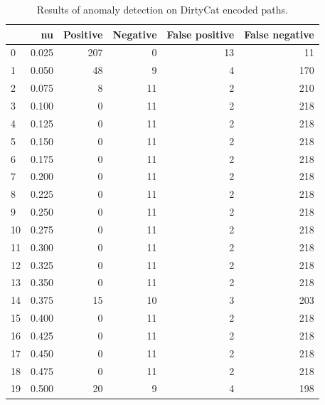 \documentclass[a4paper,twoside,12pt]{book}
\begin{document}
\begin{appendices}
\begin{table}
	\centering
	\caption{Results of anomaly detection on DirtyCat encoded paths.}
	\label{id:tab:ocsvmOnDirtyCatBad}
	\begin{tabular}{lrrrrr}
		\toprule
		{} &     nu &  Positive &  Negative &  False positive &  False negative \\
		\midrule
		0  &  0.025 &       207 &         0 &              13 &              11 \\
		1  &  0.050 &        48 &         9 &               4 &             170 \\
		2  &  0.075 &         8 &        11 &               2 &             210 \\
		3  &  0.100 &         0 &        11 &               2 &             218 \\
		4  &  0.125 &         0 &        11 &               2 &             218 \\
		5  &  0.150 &         0 &        11 &               2 &             218 \\
		6  &  0.175 &         0 &        11 &               2 &             218 \\
		7  &  0.200 &         0 &        11 &               2 &             218 \\
		8  &  0.225 &         0 &        11 &               2 &             218 \\
		9  &  0.250 &         0 &        11 &               2 &             218 \\
		10 &  0.275 &         0 &        11 &               2 &             218 \\
		11 &  0.300 &         0 &        11 &               2 &             218 \\
		12 &  0.325 &         0 &        11 &               2 &             218 \\
		13 &  0.350 &         0 &        11 &               2 &             218 \\
		14 &  0.375 &        15 &        10 &               3 &             203 \\
		15 &  0.400 &         0 &        11 &               2 &             218 \\
		16 &  0.425 &         0 &        11 &               2 &             218 \\
		17 &  0.450 &         0 &        11 &               2 &             218 \\
		18 &  0.475 &         0 &        11 &               2 &             218 \\
		19 &  0.500 &        20 &         9 &               4 &             198 \\

\end{tabular}
\end{table}
\end{appendices}
\end{document}
